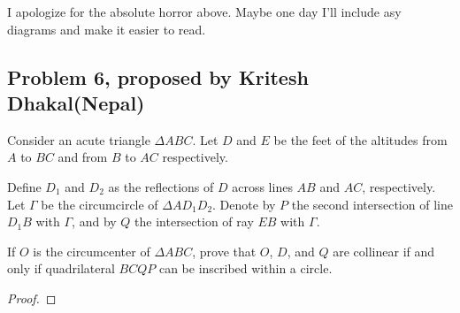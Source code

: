 \documentclass[11pt]{scrartcl}
\begin{document}
\begin{remark}
    I apologize for the absolute horror above. Maybe one day I'll include asy diagrams and make it easier to read.
\end{remark}

\newpage

\subsection{Problem 6, proposed by Kritesh Dhakal(Nepal)}

\begin{problem}
    Consider an acute triangle $\Delta ABC$. Let $D$ and $E$ be the feet of the altitudes from $A$ to $BC$ and from $B$ to $AC$ respectively.

    Define $D_1$ and $D_2$ as the reflections of $D$ across lines $AB$ and $AC$, respectively. Let $\Gamma$ be the circumcircle of $\Delta AD_1D_2$. 
    Denote by $P$ the second intersection of line $D_1B$ with $\Gamma$, and by $Q$ the intersection of ray $EB$ with $\Gamma$.

    If $O$ is the circumcenter of $\Delta ABC$, prove that $O$, $D$, and $Q$ are collinear if and only if quadrilateral $BCQP$ can be inscribed 
    within a circle.
\end{problem}

\begin{proof}

\end{proof}
\end{document}
